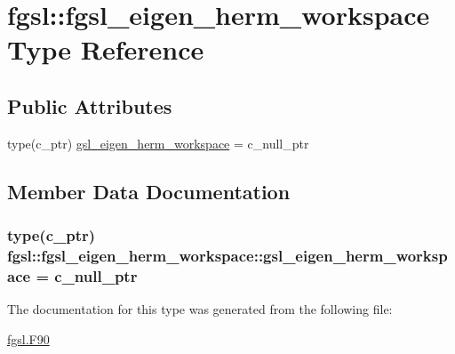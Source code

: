 \hypertarget{structfgsl_1_1fgsl__eigen__herm__workspace}{\section{fgsl\-:\-:fgsl\-\_\-eigen\-\_\-herm\-\_\-workspace Type Reference}
\label{structfgsl_1_1fgsl__eigen__herm__workspace}
}
\subsection*{Public Attributes}
\begin{DoxyCompactItemize}
\item 
type(c\-\_\-ptr) \hyperlink{structfgsl_1_1fgsl__eigen__herm__workspace_a7f78768ae373ecc0557037dda210b843}{gsl\-\_\-eigen\-\_\-herm\-\_\-workspace} = c\-\_\-null\-\_\-ptr
\end{DoxyCompactItemize}


\subsection{Member Data Documentation}
\hypertarget{structfgsl_1_1fgsl__eigen__herm__workspace_a7f78768ae373ecc0557037dda210b843}{
\subsubsection[{gsl\-\_\-eigen\-\_\-herm\-\_\-workspace}]{\setlength{\rightskip}{0pt plus 5cm}type(c\-\_\-ptr) fgsl\-::fgsl\-\_\-eigen\-\_\-herm\-\_\-workspace\-::gsl\-\_\-eigen\-\_\-herm\-\_\-workspace = c\-\_\-null\-\_\-ptr}}\label{structfgsl_1_1fgsl__eigen__herm__workspace_a7f78768ae373ecc0557037dda210b843}


The documentation for this type was generated from the following file\-:\begin{DoxyCompactItemize}
\item 
\hyperlink{fgsl_8F90}{fgsl.\-F90}\end{DoxyCompactItemize}
